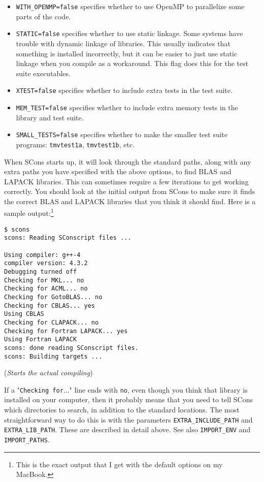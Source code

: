 \documentclass[twoside,letterpaper,11pt]{article}
\begin{document}
\begin{enumerate}
\begin{itemize}
\item \texttt{WITH\_OPENMP=false} specifies whether to use OpenMP to parallelize some parts of the code.
\item \texttt{STATIC=false} specifies whether to use static linkage.  Some systems have trouble with
dynamic linkage of libraries.  This usually indicates that something is installed incorrectly, but
it can be easier to just use static linkage when you compile as a workaround.  This flag does this
for the test suite executables.
\item \texttt{XTEST=false} specifies whether to include extra tests in the test suite.
\item \texttt{MEM\_TEST=false} specifies whether to include extra memory tests in the library and test suite.
\item \texttt{SMALL\_TESTS=false} specifies whether to make the smaller test suite programs: \texttt{tmvtest1a}, \texttt{tmvtest1b}, etc. 
\end{itemize}

When SCons starts up, it will look through the standard paths, along with any extra paths you have
specified with the above options, to find BLAS
and LAPACK libraries.  This can sometimes require a few iterations to get working correctly.  
You should look at the initial output from SCons to make sure it finds the correct BLAS
and LAPACK libraries that you think it should find.  Here is a sample output:\footnote{
This is the exact output that I get with the default options on my MacBook.}
\begin{verbatim}
$ scons
scons: Reading SConscript files ...

Using compiler: g++-4
compiler version: 4.3.2
Debugging turned off
Checking for MKL... no
Checking for ACML... no
Checking for GotoBLAS... no
Checking for CBLAS... yes
Using CBLAS
Checking for CLAPACK... no
Checking for Fortran LAPACK... yes
Using Fortran LAPACK
scons: done reading SConscript files.
scons: Building targets ...
\end{verbatim}
\vspace{-11pt}(\emph{Starts the actual compiling})

If a "\texttt{Checking for}..." line ends with \texttt{no}, even though you think that library is installed
on your computer, then it probably means that you need to tell SCons which directories
to search, in addition to the standard locations.  The most straightforward way to do this is
with the parameters \texttt{EXTRA\_INCLUDE\_PATH} and \texttt{EXTRA\_LIB\_PATH}.  
These are described in detail above.  See also \texttt{IMPORT\_ENV} and \texttt{IMPORT\_PATHS}.


\end{enumerate}
\end{document}
